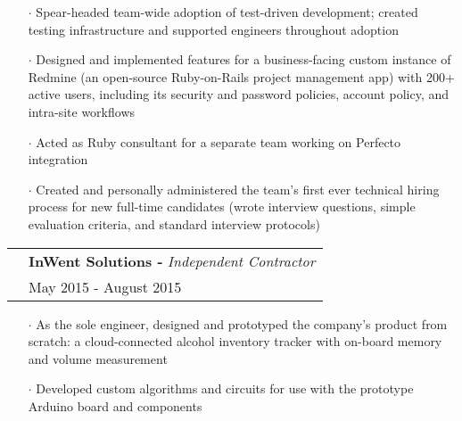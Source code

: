 \documentclass[a4paper, oneside, final]{scrartcl} %
\newcommand{\gray}{\rowcolor[gray]{.90}} %
\begin{document}
\begin{center}
\begin{itemize}
    \item[$\cdot$] Spear-headed team-wide adoption of test-driven development; created testing infrastructure and supported engineers throughout adoption \\
    \item[$\cdot$] Designed and implemented features for a business-facing custom instance of Redmine (an open-source Ruby-on-Rails project management app) with 200+ active users, including its security and password policies, account policy, and intra-site workflows \\
    \item[$\cdot$] Acted as Ruby consultant for a separate team working on Perfecto integration \\
    \item[$\cdot$] Created and personally administered the team’s first ever technical hiring process for new full-time candidates (wrote interview questions, simple evaluation criteria, and standard interview protocols)\\

  \end{itemize}

  \vspace{-0.05cm}

  \begin{tabularx}{1.00\linewidth}{>{\raggedleft\scshape}p{0cm}X}
    \gray & \textbf{InWent Solutions -} \textit{Independent Contractor}\\
    \gray & {May 2015 - August 2015}\\
  \end{tabularx}
  \vspace{-0.2cm}
  \begin{itemize}\itemsep-0.2cm
      \vspace{-0.1cm}

    \item[$\cdot$] As the sole engineer, designed and prototyped the company’s product from scratch: a cloud-connected alcohol inventory tracker with on-board memory and volume measurement  \\
    \item[$\cdot$] Developed custom algorithms and circuits for use with the prototype Arduino board and components\\


\end{itemize}
\end{center}
\end{document}
